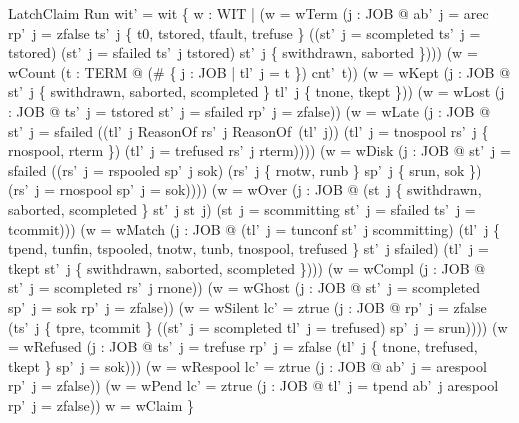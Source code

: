 \documentclass[a4paper,10pt,fleqn]{article}
\begin{document}
\begin{schema}{LatchClaim}
\Delta Run
\where
wit' = wit \cup \{ w : WIT |
  (w = wTerm \land (\exists j : JOB @ ab'~j = arec \land rp'~j = zfalse \land
     ts'~j \in \{ t0, tstored, tfault, trefuse \} \land
     \lnot ((st'~j = scompleted \land ts'~j = tstored) \lor
            (st'~j = sfailed \land ts'~j \neq tstored) \lor
            st'~j \in \{ swithdrawn, saborted \}))) \lor
  (w = wCount \land (\exists t : TERM @
     (\# \{ j : JOB | tl'~j = t \}) \neq cnt'~t)) \lor
  (w = wKept \land (\exists j : JOB @ st'~j \in \{ swithdrawn, saborted, scompleted \} \land
     tl'~j \notin \{ tnone, tkept \})) \lor
  (w = wLost \land (\exists j : JOB @ ts'~j = tstored \land st'~j = sfailed \land
     rp'~j = zfalse)) \lor
  (w = wLate \land (\exists j : JOB @ st'~j = sfailed \land
     ((tl'~j \in \dom ReasonOf \land rs'~j \neq ReasonOf~(tl'~j)) \lor
      (tl'~j = tnospool \land rs'~j \notin \{ rnospool, rterm \}) \lor
      (tl'~j = trefused \land rs'~j \neq rterm)))) \lor
  (w = wDisk \land (\exists j : JOB @ st'~j = sfailed \land
     ((rs'~j = rspooled \land sp'~j \neq sok) \lor
      (rs'~j \in \{ rnotw, runb \} \land sp'~j \in \{ srun, sok \}) \lor
      (rs'~j = rnospool \land sp'~j = sok)))) \lor
  (w = wOver \land (\exists j : JOB @
     (st~j \in \{ swithdrawn, saborted, scompleted \} \land st'~j \neq st~j) \lor
     (st~j = scommitting \land st'~j = sfailed \land ts'~j = tcommit))) \lor
  (w = wMatch \land (\exists j : JOB @
     (tl'~j = tunconf \land st'~j \neq scommitting) \lor
     (tl'~j \in \{ tpend, tunfin, tspooled, tnotw, tunb, tnospool, trefused \} \land
        st'~j \neq sfailed) \lor
     (tl'~j = tkept \land st'~j \notin \{ swithdrawn, saborted, scompleted \}))) \lor
  (w = wCompl \land (\exists j : JOB @ st'~j = scompleted \land rs'~j \neq rnone)) \lor
  (w = wGhost \land (\exists j : JOB @ st'~j = scompleted \land sp'~j = sok \land
     rp'~j = zfalse)) \lor
  (w = wSilent \land lc' = ztrue \land (\exists j : JOB @ rp'~j = zfalse \land
     (ts'~j \in \{ tpre, tcommit \} \lor
      ((st'~j = scompleted \lor tl'~j = trefused) \land sp'~j = srun)))) \lor
  (w = wRefused \land (\exists j : JOB @ ts'~j = trefuse \land rp'~j = zfalse \land
     (tl'~j \notin \{ tnone, trefused, tkept \} \lor sp'~j = sok))) \lor
  (w = wRespool \land lc' = ztrue \land
     (\exists j : JOB @ ab'~j = arespool \land rp'~j = zfalse)) \lor
  (w = wPend \land lc' = ztrue \land
     (\exists j : JOB @ tl'~j = tpend \land ab'~j \neq arespool \land rp'~j = zfalse)) \lor w = wClaim \}
\end{schema}
\end{document}
